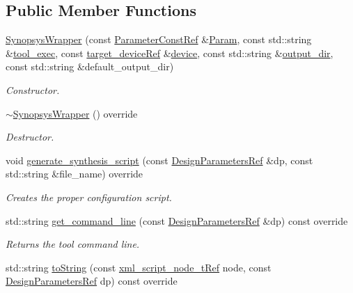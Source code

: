 \subsection*{Public Member Functions}
\begin{DoxyCompactItemize}
\item 
\hyperlink{classSynopsysWrapper_a912d0f39b89cfb7d222fef79cf3d3e8a}{Synopsys\+Wrapper} (const \hyperlink{Parameter_8hpp_a37841774a6fcb479b597fdf8955eb4ea}{Parameter\+Const\+Ref} \&\hyperlink{classSynthesisTool_a854ef102782ff4d069e1aa6d1a94d64e}{Param}, const std\+::string \&\hyperlink{classSynthesisTool_a78fd58496215c69838de4269204804a5}{tool\+\_\+exec}, const \hyperlink{target__device_8hpp_acedb2b7a617e27e6354a8049fee44eda}{target\+\_\+device\+Ref} \&\hyperlink{classSynthesisTool_a07bf37421c6cff80ba70682ea2b2e3ae}{device}, const std\+::string \&\hyperlink{classSynthesisTool_a285793f6f539ed6f049c375cdb68d607}{output\+\_\+dir}, const std\+::string \&default\+\_\+output\+\_\+dir)
\begin{DoxyCompactList}\small\item\em Constructor. \end{DoxyCompactList}\item 
\hyperlink{classSynopsysWrapper_a2c394e097d626783a67d9a8669e6646a}{$\sim$\+Synopsys\+Wrapper} () override
\begin{DoxyCompactList}\small\item\em Destructor. \end{DoxyCompactList}\item 
void \hyperlink{classSynopsysWrapper_a9f8b574d1d4e788b6e2bcde029a3d8fd}{generate\+\_\+synthesis\+\_\+script} (const \hyperlink{DesignParameters_8hpp_ae36bb1c4c9150d0eeecfe1f96f42d157}{Design\+Parameters\+Ref} \&dp, const std\+::string \&file\+\_\+name) override
\begin{DoxyCompactList}\small\item\em Creates the proper configuration script. \end{DoxyCompactList}\item 
std\+::string \hyperlink{classSynopsysWrapper_a4d08b4d2ce868e213182fcd405022023}{get\+\_\+command\+\_\+line} (const \hyperlink{DesignParameters_8hpp_ae36bb1c4c9150d0eeecfe1f96f42d157}{Design\+Parameters\+Ref} \&dp) const override
\begin{DoxyCompactList}\small\item\em Returns the tool command line. \end{DoxyCompactList}\item 
std\+::string \hyperlink{classSynopsysWrapper_abdd13f9bc68c225978b5a29ac6250df2}{to\+String} (const \hyperlink{xml__script__command_8hpp_a1fe3d50ade66bc35e41be9b68bbbcd02}{xml\+\_\+script\+\_\+node\+\_\+t\+Ref} node, const \hyperlink{DesignParameters_8hpp_ae36bb1c4c9150d0eeecfe1f96f42d157}{Design\+Parameters\+Ref} dp) const override

\end{DoxyCompactItemize}
